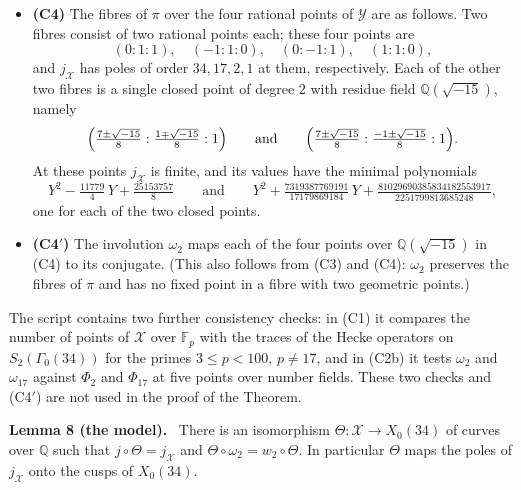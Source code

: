 \documentclass[11pt]{article}
\newenvironment{statement}[1]{\par\medskip\noindent\phantomsection\textbf{#1}\ }{\par\medskip}
\newcommand{\Q}{\mathbb Q}
\newcommand{\F}{\mathbb F}
\begin{document}
\begin{itemize}
\item \textbf{(C4)} The fibres of \(\pi\) over the four rational points of \(\mathcal Y\) are
as follows. Two fibres consist of two rational points each; these four points are
\[(0:1:1),\quad(-1:1:0),\quad(0:-1:1),\quad(1:1:0),\]
and \(j_{\mathcal X}\) has poles of order \(34,17,2,1\) at them, respectively. Each of the
other two fibres is a single closed point of degree \(2\) with residue field
\(\Q(\sqrt{-15})\), namely
\[\Bigl(\tfrac{7\pm\sqrt{-15}}8:\tfrac{1\mp\sqrt{-15}}8:1\Bigr)\qquad\text{and}\qquad
\Bigl(\tfrac{7\pm\sqrt{-15}}8:\tfrac{-1\pm\sqrt{-15}}8:1\Bigr).\]
At these points \(j_{\mathcal X}\) is finite, and its values have the minimal polynomials
\[Y^2-\tfrac{11779}{4}\,Y+\tfrac{25153757}{8}\qquad\text{and}\qquad
Y^2+\tfrac{7319387769191}{17179869184}\,Y+\tfrac{81029690385834182553917}{2251799813685248},\]
one for each of the two closed points.
\item \textbf{(C4\('\))} The involution \(\omega_2\) maps each of the four points over
\(\Q(\sqrt{-15})\) in (C4) to its conjugate. (This also follows from (C3) and (C4): \(\omega_2\)
preserves the fibres of \(\pi\) and has no fixed point in a fibre with two geometric points.)
\end{itemize}
The script contains two further consistency checks: in (C1) it compares the number of points of
\(\mathcal X\) over \(\F_p\) with the traces of the Hecke operators on \(S_2(\Gamma_0(34))\) for
the primes \(3\le p<100\), \(p\neq17\), and in (C2b) it tests \(\omega_2\) and \(\omega_{17}\)
against \(\Phi_2\) and \(\Phi_{17}\) at five points over number fields. These two checks and
(C4\('\)) are not used in the proof of the Theorem.

\begin{statement}{Lemma 8 (the model).}\label{lemma-model}
There is an isomorphism \(\Theta:\mathcal X\to X_0(34)\) of curves over \(\Q\) such that
\(j\circ\Theta=j_{\mathcal X}\) and \(\Theta\circ\omega_2=w_2\circ\Theta\). In particular
\(\Theta\) maps the poles of \(j_{\mathcal X}\) onto the cusps of \(X_0(34)\).
\end{statement}
\end{document}
